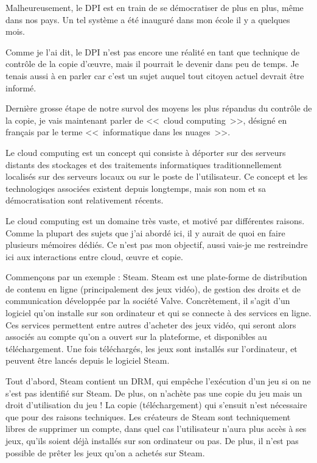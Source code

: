 Malheureusement, le DPI est en train de se démocratiser de plus en plus, même dans nos pays.
Un tel système a été inauguré dans mon école il y a quelques mois.

Comme je l'ai dit, le DPI n'est pas encore une réalité en tant que technique de contrôle de la copie d'œuvre, mais il pourrait le devenir dans peu de temps.
Je tenais aussi à en parler car c'est un sujet auquel tout citoyen actuel devrait être informé.

Dernière grosse étape de notre survol des moyens les plus répandus du contrôle de la copie, je vais maintenant parler de <<~cloud computing~>>, désigné en français par le terme <<~informatique dans les nuages~>>.

Le cloud computing est un concept qui consiste à déporter sur des serveurs distants des stockages et des traitements informatiques traditionnellement localisés sur des serveurs locaux ou sur le poste de l'utilisateur.
Ce concept et les technologiqes associées existent depuis longtemps, mais son nom et sa démocratisation sont relativement récents.

Le cloud computing est un domaine très vaste, et motivé par différentes raisons.
Comme la plupart des sujets que j'ai abordé ici, il y aurait de quoi en faire plusieurs mémoires dédiés.
Ce n'est pas mon objectif, aussi vais-je me restreindre ici aux interactions entre cloud, œuvre et copie.

Commençons par un exemple : Steam.
Steam est une plate-forme de distribution de contenu en ligne (principalement des jeux vidéo), de gestion des droits et de communication développée par la société Valve.
Concrètement, il s'agit d'un logiciel qu'on installe sur son ordinateur et qui se connecte à des services en ligne.
Ces services permettent entre autres d'acheter des jeux vidéo, qui seront alors associés au compte qu'on a ouvert sur la plateforme, et disponibles au téléchargement.
Une fois téléchargés, les jeux sont installés sur l'ordinateur, et peuvent être lancés depuis le logiciel Steam.

Tout d'abord, Steam contient un DRM, qui empêche l'exécution d'un jeu si on ne s'est pas identifié sur Steam.
De plus, on n'achète pas une copie du jeu mais un droit d'utilisation du jeu !
La copie (téléchargement) qui s'ensuit n'est nécessaire que pour des raisons techniques.
Les créateurs de Steam sont techniquement libres de supprimer un compte, dans quel cas l'utilisateur n'aura plus accès à ses jeux, qu'ils soient déjà installés sur son ordinateur ou pas.
De plus, il n'est pas possible de prêter les jeux qu'on a achetés sur Steam.

